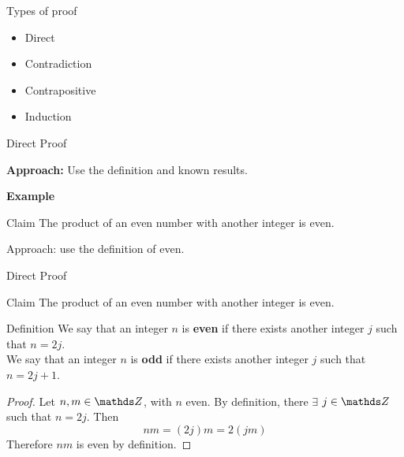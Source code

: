 \documentclass [aspectratio=169]{beamer}
\begin{document}
\begin{frame}{Types of proof}
\begin{itemize}
	\item Direct
	\item Contradiction
	\item Contrapositive
	\item Induction
\end{itemize}
\end{frame}

\begin{frame}{Direct Proof}

{\bf Approach:} Use the definition and known results. \\
\vspace{1em}

\large{\bf Example}

\begin{exampleblock}{Claim}
The product of an even number with another integer is even.
\end{exampleblock}

\vspace{1em}
Approach: use the definition of even.




\end{frame}

\begin{frame}{Direct Proof}

\begin{exampleblock}{Claim}
The product of an even number with another integer is even.
\end{exampleblock}


\begin{alertblock}{Definition}
We say that an integer $n$ is {\bf even} if there exists another integer $j$ such that $n=2j$. \\
We say that an integer $n$ is {\bf odd} if there exists another integer $j$ such that $n=2j+1$.
\end{alertblock}

\begin{proof}
Let $n, m \in \Z$, with $n$ even. By definition, there $\exists$ $j \in \Z$ such that $n = 2j$. Then 
$$ n m  =  (2 j) m = 2 (j m)$$
Therefore $n m$ is even by definition. 
\end{proof}

\end{frame}
\end{document}
